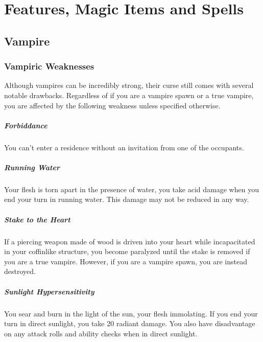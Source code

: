 \documentclass[letterpaper,openany,oneside,twocolumn]{book}
\begin{document}
\onecolumn


\rendercharactersheet

\renderbackgroundsheet

\renderspellsheet


\restoregeometry
\twocolumn

\chapter*{Features, Magic Items and Spells}

\section*{Vampire}
\subsection*{Vampiric Weaknesses}
Although vampires can be incredibly strong, their curse still comes with several notable drawbacks. Regardless of if you are a vampire spawn or a true vampire, you are affected by the following weakness unless specified otherwise.
\paragraph*{Forbiddance}
You can't enter a residence without an invitation from one of the occupants.
\paragraph*{Running Water}
Your flesh is torn apart in the presence of water, you take  acid damage when you end your turn in running water. This damage may not be reduced in any way.
\paragraph*{Stake to the Heart}
If a piercing weapon made of wood is driven into your heart while incapacitated in your coffinlike structure, you become paralyzed until the stake is removed if you are a true vampire. However, if you are a vampire spawn, you are instead destroyed.
\paragraph*{Sunlight Hypersensitivity}
You sear and burn in the light of the sun, your flesh immolating. If you end your turn in direct sunlight, you take 20 radiant damage. You also have disadvantage on any attack rolls and ability checks when in direct sunlight.
\end{document}
